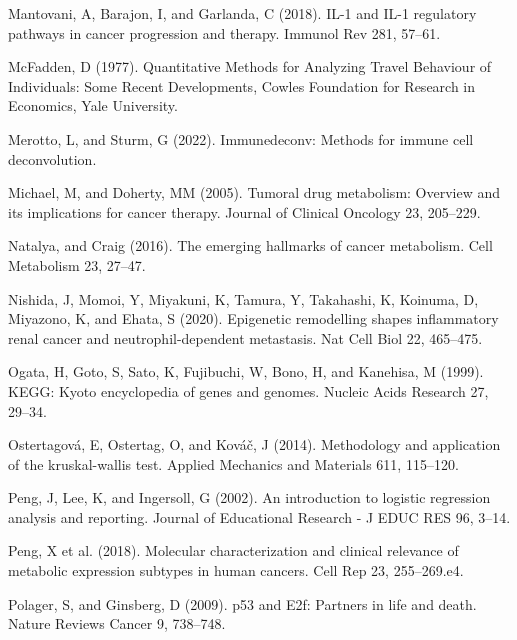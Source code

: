 \documentclass[
  parskip,
  oneside]{\documentclass[oneside]{book}}
\newlength{\cslhangindent}
\newlength{\cslentryspacingunit} %
\newenvironment{CSLReferences}[2] %
 {%
  \setlength{\parindent}{0pt}
  \ifodd #1
  \let\oldpar\par
  \def\par{\hangindent=\cslhangindent\oldpar}
  \fi
  \setlength{\parskip}{#2\cslentryspacingunit}
 }%
 {}
\begin{document}
\begin{CSLReferences}{0}{0}
\leavevmode{}%
Mantovani, A, Barajon, I, and Garlanda, C (2018). IL-1 and IL-1
regulatory pathways in cancer progression and therapy. Immunol Rev 281,
57--61.

\leavevmode{}%
McFadden, D (1977). {Quantitative Methods for Analyzing Travel Behaviour
of Individuals: Some Recent Developments}, Cowles Foundation for
Research in Economics, Yale University.

\leavevmode{}%
Merotto, L, and Sturm, G (2022). Immunedeconv: Methods for immune cell
deconvolution.

\leavevmode{}%
Michael, M, and Doherty, MM (2005). Tumoral drug metabolism: Overview
and its implications for cancer therapy. Journal of Clinical Oncology
23, 205--229.

\leavevmode{}%
Natalya, and Craig (2016). The emerging hallmarks of cancer metabolism.
Cell Metabolism 23, 27--47.

\leavevmode{}%
Nishida, J, Momoi, Y, Miyakuni, K, Tamura, Y, Takahashi, K, Koinuma, D,
Miyazono, K, and Ehata, S (2020). Epigenetic remodelling shapes
inflammatory renal cancer and neutrophil-dependent metastasis. Nat Cell
Biol 22, 465--475.

\leavevmode{}%
Ogata, H, Goto, S, Sato, K, Fujibuchi, W, Bono, H, and Kanehisa, M
(1999). KEGG: Kyoto encyclopedia of genes and genomes. Nucleic Acids
Research 27, 29--34.

\leavevmode{}%
Ostertagová, E, Ostertag, O, and Kováč, J (2014). Methodology and
application of the kruskal-wallis test. Applied Mechanics and Materials
611, 115--120.

\leavevmode{}%
Peng, J, Lee, K, and Ingersoll, G (2002). An introduction to logistic
regression analysis and reporting. Journal of Educational Research - J
EDUC RES 96, 3--14.

\leavevmode{}%
Peng, X et al. (2018). Molecular characterization and clinical relevance
of metabolic expression subtypes in human cancers. Cell Rep 23,
255--269.e4.

\leavevmode{}%
Polager, S, and Ginsberg, D (2009). p53 and E2f: Partners in life and
death. Nature Reviews Cancer 9, 738--748.


\end{CSLReferences}
\end{document}
